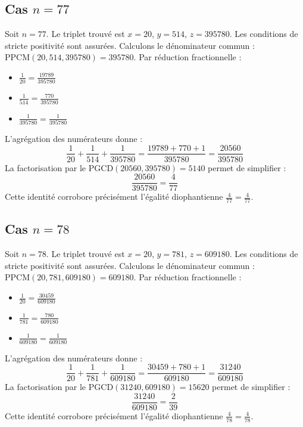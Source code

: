 \documentclass[11pt,a4paper]{article}
\begin{document}
\subsection{Cas $n = 77$}
Soit $n = 77$. Le triplet trouvé est $x = 20$, $y = 514$, $z = 395780$.
Les conditions de stricte positivité sont assurées.
Calculons le dénominateur commun : $\text{PPCM}(20, 514, 395780) = 395780$.
Par réduction fractionnelle :
\begin{itemize}
    \item $\frac{1}{20} = \frac{19789}{395780}$
    \item $\frac{1}{514} = \frac{770}{395780}$
    \item $\frac{1}{395780} = \frac{1}{395780}$
\end{itemize}
L'agrégation des numérateurs donne :
$$ \frac{1}{20} + \frac{1}{514} + \frac{1}{395780} = \frac{19789 + 770 + 1}{395780} = \frac{20560}{395780} $$
La factorisation par le $\text{PGCD}(20560, 395780) = 5140$ permet de simplifier :
$$ \frac{20560}{395780} = \frac{4}{77} $$
Cette identité corrobore précisément l'égalité diophantienne $\frac{4}{77} = \frac{4}{77}$.

\subsection{Cas $n = 78$}
Soit $n = 78$. Le triplet trouvé est $x = 20$, $y = 781$, $z = 609180$.
Les conditions de stricte positivité sont assurées.
Calculons le dénominateur commun : $\text{PPCM}(20, 781, 609180) = 609180$.
Par réduction fractionnelle :
\begin{itemize}
    \item $\frac{1}{20} = \frac{30459}{609180}$
    \item $\frac{1}{781} = \frac{780}{609180}$
    \item $\frac{1}{609180} = \frac{1}{609180}$
\end{itemize}
L'agrégation des numérateurs donne :
$$ \frac{1}{20} + \frac{1}{781} + \frac{1}{609180} = \frac{30459 + 780 + 1}{609180} = \frac{31240}{609180} $$
La factorisation par le $\text{PGCD}(31240, 609180) = 15620$ permet de simplifier :
$$ \frac{31240}{609180} = \frac{2}{39} $$
Cette identité corrobore précisément l'égalité diophantienne $\frac{4}{78} = \frac{4}{78}$.
\end{document}
